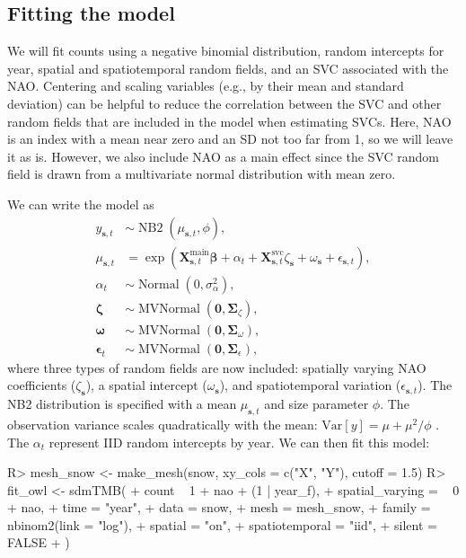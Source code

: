 \documentclass[article]{jss}\usepackage[]{graphicx}\usepackage[dvipsnames]{xcolor}
\begin{document}
\subsection{Fitting the model}

We will fit counts using a negative binomial \citep[NB2;][]{hilbe2011} distribution, random intercepts for year, spatial and spatiotemporal random fields, and an SVC associated with the NAO.
Centering and scaling variables (e.g., by their mean and standard deviation) can be helpful to reduce the correlation between the SVC and other random fields that are included in the model when estimating SVCs.
Here, NAO is an index with a mean near zero and an SD not too far from 1, so we will leave it as is.
However, we also include NAO as a main effect since the SVC random field is drawn from a multivariate normal distribution with mean zero.

We can write the model as
\[
\begin{aligned}
y_{\bm{s},t} &\sim \operatorname{NB2}
  \left(
  \mu_{\bm{s},t},
  \phi
  \right),\\
\mu_{\bm{s},t} &=
\exp \left( \bm{X}^{\mathrm{main}}_{\bm{s},t} \bm{\beta} +
\alpha_t +
\bm{X}^{\mathrm{svc}}_{\bm{s},t} \zeta_{\bm{s}} +
\omega_{\bm{s}} +
\epsilon_{\bm{s},t} \right),\\
\alpha_t &\sim \operatorname{Normal} (0, \sigma_\alpha^2 ),\\
\bm{\zeta} &\sim \operatorname{MVNormal} \left( \bm{0}, \bm{\Sigma}_\zeta \right),\\
\bm{\omega} &\sim \operatorname{MVNormal} \left( \bm{0}, \bm{\Sigma}_\omega \right),\\
\bm{\epsilon}_{t} &\sim \operatorname{MVNormal} \left( \bm{0}, \bm{\Sigma}_{\epsilon} \right),
\end{aligned}
\]
where three types of random fields are now included:
spatially varying NAO coefficients ($\zeta_{\bm{s}}$),
a spatial intercept ($\omega_{\bm{s}}$), and
spatiotemporal variation ($\epsilon_{\bm{s},t}$).
The NB2 distribution is specified with a mean $\mu_{\bm{s},t}$ and size parameter $\phi$.
The observation variance scales quadratically with the mean: $\mathrm{Var}[y] = \mu + \mu^2 / \phi$ \citep{hilbe2011}.
The $\alpha_t$ represent IID random intercepts by year.
We can then fit this model:

\begin{Schunk}
\begin{Sinput}
R> mesh_snow <- make_mesh(snow, xy_cols = c("X", "Y"), cutoff = 1.5)
R> fit_owl <- sdmTMB(
+    count ~ 1 + nao + (1 | year_f),
+    spatial_varying = ~ 0 + nao,
+    time = "year",
+    data = snow,
+    mesh = mesh_snow,
+    family = nbinom2(link = "log"),
+    spatial = "on",
+    spatiotemporal = "iid",
+    silent = FALSE
+  )
\end{Sinput}
\end{Schunk}
\end{document}
